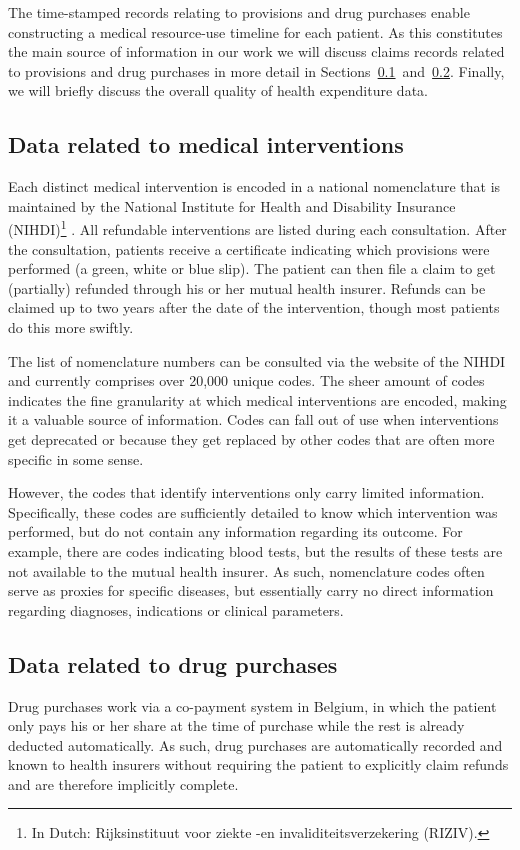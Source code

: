The time-stamped records relating to provisions and drug purchases enable constructing a medical resource-use timeline for each patient. As this constitutes the main source of information in our work we will discuss claims records related to provisions and drug purchases in more detail in Sections~\ref{intro:interventions}~and~\ref{intro:drugs}. Finally, we will briefly discuss the overall quality of health expenditure data.


\subsection{Data related to medical interventions} \label{intro:interventions}
Each distinct medical intervention is encoded in a national nomenclature that is maintained by the National Institute for Health and Disability Insurance (NIHDI)\footnote{In Dutch: Rijksinstituut voor ziekte -en invaliditeitsverzekering (RIZIV).} \citep{van2008financing}. All refundable interventions are listed during each consultation. After the consultation, patients receive a certificate indicating which provisions were performed (a green, white or blue slip). The patient can then file a claim to get (partially) refunded through his or her mutual health insurer. Refunds can be claimed up to two years after the date of the intervention, though most patients do this more swiftly.

The list of nomenclature numbers can be consulted via the website of the NIHDI and currently comprises over 20,000 unique codes. The sheer amount of codes indicates the fine granularity at which medical interventions are encoded, making it a valuable source of information. Codes can fall out of use when interventions get deprecated or because they get replaced by other codes that are often more specific in some sense.

However, the codes that identify interventions only carry limited information. Specifically, these codes are sufficiently detailed to know which intervention was performed, but do not contain any information regarding its outcome. For example, there are codes indicating blood tests, but the results of these tests are not available to the mutual health insurer. As such, nomenclature codes often serve as proxies for specific diseases, but essentially carry no direct information regarding diagnoses, indications or clinical parameters.

\subsection{Data related to drug purchases} \label{intro:drugs}
Drug purchases work via a co-payment system in Belgium, in which the patient only pays his or her share at the time of purchase while the rest is already deducted automatically. As such, drug purchases are automatically recorded and known to health insurers without requiring the patient to explicitly claim refunds and are therefore implicitly complete.

